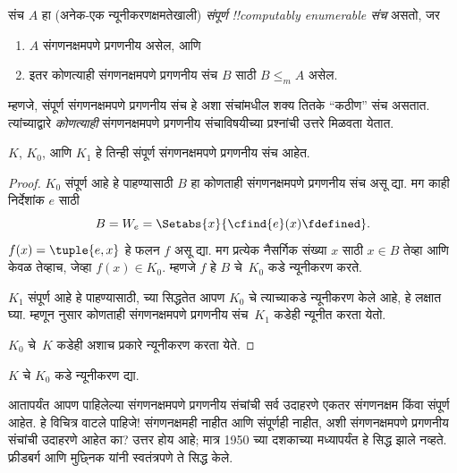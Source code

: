 \documentclass[../../../include/open-logic-section]{subfiles}
\begin{document}

\begin{defn}
संच $A$ हा (अनेक-एक न्यूनीकरणक्षमतेखाली) \emph{संपूर्ण
!!{computably enumerable} संच} असतो, जर
\begin{enumerate}
\item $A$ संगणनक्षमपणे प्रगणनीय असेल, आणि
\item इतर कोणत्याही संगणनक्षमपणे प्रगणनीय संच $B$ साठी $B \leq_m A$ असेल.
\end{enumerate}
\end{defn}

म्हणजे, संपूर्ण संगणनक्षमपणे प्रगणनीय संच हे अशा संचांमधील
शक्य तितके ``कठीण'' संच असतात. त्यांच्याद्वारे
\emph{कोणत्याही} संगणनक्षमपणे प्रगणनीय संचाविषयीच्या
प्रश्नांची उत्तरे मिळवता येतात.

\begin{thm}
$K$, $K_0$, आणि $K_1$ हे तिन्ही संपूर्ण संगणनक्षमपणे
प्रगणनीय संच आहेत.
\end{thm}

\begin{proof}
$K_0$ संपूर्ण आहे हे पाहण्यासाठी $B$ हा कोणताही
संगणनक्षमपणे प्रगणनीय संच असू द्या. मग काही निर्देशांक $e$
साठी
\[
B = W_e = \Setabs{x}{\cfind{e}(x) \fdefined}.
\]
$f(x) = \tuple{e, x}$ हे फलन $f$ असू द्या. मग प्रत्येक
नैसर्गिक संख्या $x$ साठी $x \in B$ तेव्हा आणि केवळ तेव्हाच, जेव्हा
$f(x) \in K_0$. म्हणजे $f$ हे $B$ चे~$K_0$ कडे
न्यूनीकरण करते.

$K_1$ संपूर्ण आहे हे पाहण्यासाठी, 
च्या सिद्धतेत आपण $K_0$ चे त्याच्याकडे न्यूनीकरण केले
आहे, हे लक्षात घ्या. म्हणून 
नुसार कोणताही संगणनक्षमपणे प्रगणनीय संच~$K_1$ कडेही
न्यूनीत करता येतो.

$K_0$ चे~$K$ कडेही अशाच प्रकारे न्यूनीकरण करता येते.
\end{proof}

\begin{prob}
$K$ चे $K_0$ कडे न्यूनीकरण द्या.
\end{prob}

\begin{digress}
आतापर्यंत आपण पाहिलेल्या संगणनक्षमपणे प्रगणनीय संचांची सर्व
उदाहरणे एकतर संगणनक्षम किंवा संपूर्ण आहेत. हे विचित्र वाटले
पाहिजे!{} संगणनक्षमही नाहीत आणि संपूर्णही नाहीत, अशी
संगणनक्षमपणे प्रगणनीय संचांची उदाहरणे आहेत का? उत्तर होय
आहे; मात्र 1950 च्या दशकाच्या मध्यापर्यंत हे सिद्ध झाले
नव्हते. फ्रीडबर्ग आणि मुछ्निक यांनी स्वतंत्रपणे ते सिद्ध केले.
\end{digress}
\end{document}
